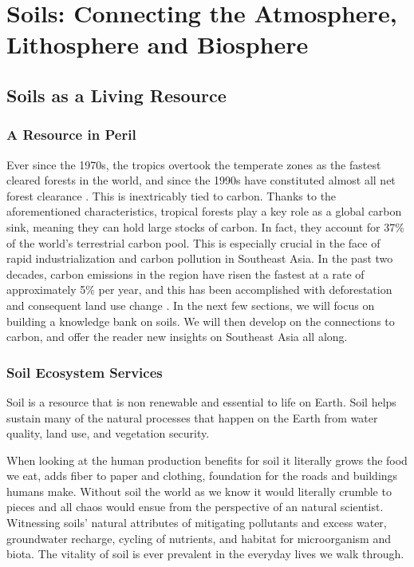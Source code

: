 \chapter{Soils: Connecting the Atmosphere, Lithosphere and Biosphere}\label{ch:soils}

\section{Soils as a Living Resource}

\subsection{A Resource in Peril}

Ever since the 1970s, the tropics overtook the temperate zones as the fastest cleared forests in the world, and since the 1990s have constituted almost all net forest clearance \citep{houghton1996land}. This is inextricably tied to carbon. Thanks to the aforementioned characteristics, tropical forests play a key role as a global carbon sink, meaning they can hold large stocks of carbon. In fact, they account for 37\% of the world's terrestrial carbon pool. This is especially crucial in the face of rapid industrialization and carbon pollution in Southeast Asia. In the past two decades, carbon emissions in the region have risen the fastest at a rate of approximately 5\% per year, and this has been accomplished with deforestation and consequent land use change \citep{dixon1994carbon}. In the next few sections, we will focus on building a knowledge bank on soils. We will then develop on the connections to carbon, and offer the reader new insights on Southeast Asia all along.

\subsection{Soil Ecosystem Services}

Soil is a resource that is non renewable and essential to life on Earth. Soil helps sustain many of the natural processes that happen on the Earth from water quality, land use, and vegetation security. 

When looking at the human production benefits for soil it literally grows the food we eat, adds fiber to paper and clothing, foundation for the roads and buildings humans make. Without soil the world as we know it would literally crumble to pieces and all chaos would ensue from the perspective of an natural scientist. Witnessing soils' natural attributes of mitigating pollutants and excess water, groundwater recharge, cycling of nutrients, and habitat for microorganism and biota. The vitality of soil is ever prevalent in the everyday lives we walk through.

